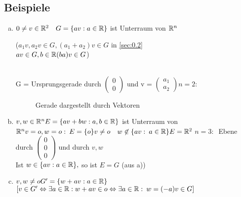 \subsection{Beispiele}\label{sec:0.3}
\begin{enumerate}[a)]
\item $0 \ne v \in \mathbb{R}^2\quad G = \{ av: a \in \mathbb{R} \}$ ist Unterraum von $\mathbb{R}^n$\\\begin{minipage}{.3\textwidth}
($a_1v,a_2v \in G, (a_1 + a_2)v \in G$ in \ref{sec:0.2}\\
$av \in G, b \in \mathbb{R} (ba)v \in G$)
\end{minipage}\\
G = Ursprungsgerade durch $\begin{pmatrix}
0\\0
\end{pmatrix}$ und v = $\begin{pmatrix}
a_1\\a_2
\end{pmatrix}
n = 2$:
\begin{figure}[h!]
\centering
\caption{Gerade dargestellt durch Vektoren}
\end{figure}
\item $v,w \in \mathbb{R}^n\\
E = \{ av + bw : a,b \in \mathbb{R} \}$ ist Unterraum von $\mathbb{R}^n\\
v = o, w = o :\: E = \{ o \}\\
v \ne o\quad w \not\in \{ av:\: a \in \mathbb{R} \}\\
E = \mathbb{R}^2 $
$n = 3:\:$ Ebene durch $\begin{pmatrix}
0\\0\\0
\end{pmatrix}$ und durch $v,w$\\
Ist $w \in \{ av : a \in \mathbb{R} \},$ so ist $E = G$ (aus a))
\item $v,w \ne o\\
G' = \{ w + av : a \in \mathbb{R}\}$\\
$[v \in G' \Leftrightarrow \exists a \in \mathbb{R}: w+ av \in o \Leftrightarrow \exists a \in \mathbb{R} :\: w = (-a)v \in G]$
\end{enumerate}
